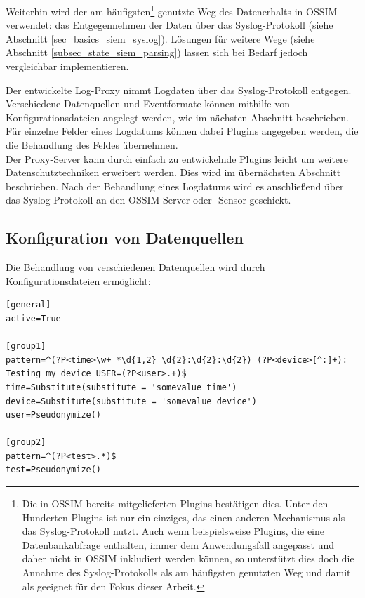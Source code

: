 Weiterhin wird der am häufigsten\footnote{
  Die in OSSIM bereits mitgelieferten Plugins bestätigen dies. Unter den Hunderten Plugins ist nur ein einziges, das einen anderen Mechanismus als das Syslog-Protokoll nutzt. Auch wenn beispielsweise Plugins, die eine Datenbankabfrage enthalten, immer dem Anwendungsfall angepasst und daher nicht in OSSIM inkludiert werden können, so unterstützt dies doch die Annahme des Syslog-Protokolls als am häufigsten genutzten Weg und damit als geeignet für den Fokus dieser Arbeit. 
} genutzte Weg des Datenerhalts in OSSIM verwendet: das Entgegennehmen der Daten über das Syslog-Protokoll (siehe Abschnitt \ref{sec_basics_siem_syslog}). Lösungen für weitere Wege (siehe Abschnitt \ref{subsec_state_siem_parsing}) lassen sich bei Bedarf jedoch vergleichbar implementieren.

Der entwickelte Log-Proxy nimmt Logdaten über das Syslog-Protokoll entgegen. Verschiedene Datenquellen und Eventformate können mithilfe von Konfigurationsdateien angelegt werden, wie im nächsten Abschnitt beschrieben. Für einzelne Felder eines Logdatums können dabei Plugins angegeben werden, die die Behandlung des Feldes übernehmen.\\
Der Proxy-Server kann durch einfach zu entwickelnde Plugins leicht um weitere Datenschutztechniken erweitert werden. Dies wird im übernächsten Abschnitt beschrieben. Nach der Behandlung eines Logdatums wird es anschließend über das Syslog-Protokoll an den OSSIM-Server oder -Sensor geschickt.

\subsection{Konfiguration von Datenquellen}
\label{sec_integration_in_ossim_datasource_config}

Die Behandlung von verschiedenen Datenquellen wird durch Konfigurationsdateien ermöglicht:

\begin{lstlisting}[morekeywords={general,active,pattern,group1,group2}]
[general]
active=True

[group1]
pattern=^(?P<time>\w+ *\d{1,2} \d{2}:\d{2}:\d{2}) (?P<device>[^:]+): Testing my device USER=(?P<user>.+)$
time=Substitute(substitute = 'somevalue_time')
device=Substitute(substitute = 'somevalue_device')
user=Pseudonymize()

[group2]
pattern=^(?P<test>.*)$
test=Pseudonymize()
\end{lstlisting}

